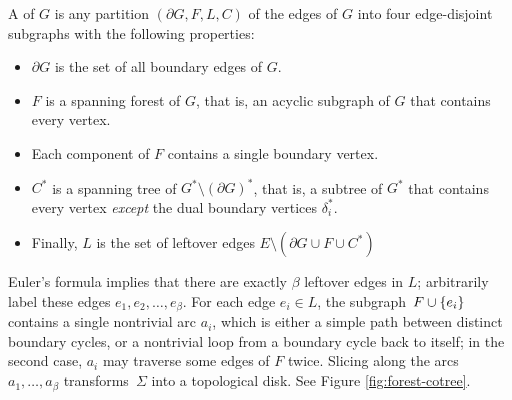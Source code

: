 \documentclass[11pt,twoside]{article}
\begin{document}
A  of $G$ is any partition $(\partial\! G, F, L, C)$ of the edges of $G$ into four edge-disjoint subgraphs with the following properties:
\begin{itemize}\itemsep0pt
\item $\partial\! G$ is the set of all boundary edges of $G$.
\item $F$ is a spanning forest of $G$, that is, an acyclic subgraph of $G$ that contains every vertex.
\item Each component of $F$ contains a single boundary vertex.
\item $C^*$ is a spanning tree of $G^*\setminus (\partial G)^*$, that is, a subtree of $G^*$ that contains every vertex \emph{except} the dual boundary vertices $\delta_i^*$.
\item Finally, $L$ is the set of leftover edges $E \setminus (\partial\!G \cup F \cup C^*)$
\end{itemize}

\noindent
Euler's formula implies that there are exactly $\beta$ leftover edges in $L$; arbitrarily label these edges $e_1, e_2, \dots, e_\beta$.  For each edge $e_i\in L$, the subgraph~$F\cup \{ e_i \}$ contains a single nontrivial arc $a_i$, which is either a simple path between distinct boundary cycles, or a nontrivial loop from a boundary cycle back to itself; in the second case, $a_i$ may traverse some edges of $F$ twice.  Slicing along the arcs $a_1, \dots, a_\beta$ transforms~$\Sigma$ into a topological disk. See Figure \ref{fig:forest-cotree}.
\end{document}
